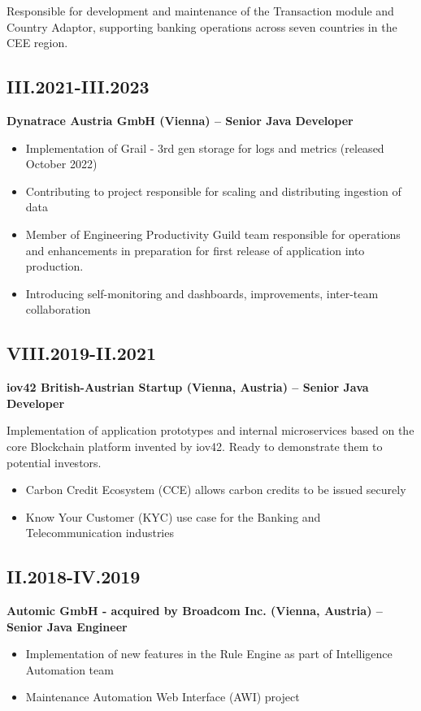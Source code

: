 \documentclass[11pt,a4paper]{article}
\begin{document}
Responsible for development and maintenance of the Transaction module and Country Adaptor, supporting banking operations across seven countries in the CEE region.

\subsection*{III.2021-III.2023}
\textbf{Dynatrace Austria GmbH (Vienna) -- Senior Java Developer}
\begin{itemize}
    \item Implementation of Grail - 3rd gen storage for logs and metrics (released October 2022)
    \item Contributing to project responsible for scaling and distributing ingestion of data
    \item Member of Engineering Productivity Guild team responsible for operations and enhancements in preparation for first release of application into production.
    \item Introducing self-monitoring and dashboards, improvements, inter-team collaboration
\end{itemize}

\subsection*{VIII.2019-II.2021}
\textbf{iov42 British-Austrian Startup (Vienna, Austria) -- Senior Java Developer}

Implementation of application prototypes and internal microservices based on the core Blockchain platform invented by iov42. Ready to demonstrate them to potential investors.
\begin{itemize}
    \item Carbon Credit Ecosystem (CCE) allows carbon credits to be issued securely
    \item Know Your Customer (KYC) use case for the Banking and Telecommunication industries
\end{itemize}

\subsection*{II.2018-IV.2019}
\textbf{Automic GmbH - acquired by Broadcom Inc. (Vienna, Austria) -- Senior Java Engineer}
\begin{itemize}
    \item Implementation of new features in the Rule Engine as part of Intelligence Automation team
    \item Maintenance Automation Web Interface (AWI) project
\end{itemize}
\end{document}
